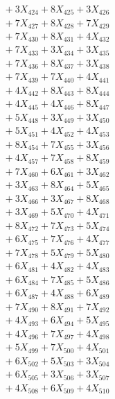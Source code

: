 \documentclass[a4paper,10pt]{article}
\begin{document}
{\begin{align}
&\;  + 3 X_{424} + 8 X_{425} + 3 X_{426} \\[0.3ex]
&\;  + 7 X_{427} + 8 X_{428} + 7 X_{429} \\[0.5ex]\allowbreak
&\;  + 7 X_{430} + 8 X_{431} + 4 X_{432} \\[0.3ex]
&\;  + 7 X_{433} + 3 X_{434} + 3 X_{435} \\[0.3ex]
&\;  + 7 X_{436} + 8 X_{437} + 3 X_{438} \\[0.3ex]
&\;  + 7 X_{439} + 7 X_{440} + 4 X_{441} \\[0.3ex]
&\;  + 4 X_{442} + 8 X_{443} + 8 X_{444} \\[0.3ex]
&\;  + 4 X_{445} + 4 X_{446} + 8 X_{447} \\[0.3ex]
&\;  + 5 X_{448} + 3 X_{449} + 3 X_{450} \\[0.3ex]
&\;  + 5 X_{451} + 4 X_{452} + 4 X_{453} \\[0.3ex]
&\;  + 8 X_{454} + 7 X_{455} + 3 X_{456} \\[0.3ex]
&\;  + 4 X_{457} + 7 X_{458} + 8 X_{459} \\[0.5ex]\allowbreak
&\;  + 7 X_{460} + 6 X_{461} + 3 X_{462} \\[0.3ex]
&\;  + 3 X_{463} + 8 X_{464} + 5 X_{465} \\[0.3ex]
&\;  + 3 X_{466} + 3 X_{467} + 8 X_{468} \\[0.3ex]
&\;  + 3 X_{469} + 5 X_{470} + 4 X_{471} \\[0.3ex]
&\;  + 8 X_{472} + 7 X_{473} + 5 X_{474} \\[0.3ex]
&\;  + 6 X_{475} + 7 X_{476} + 4 X_{477} \\[0.3ex]
&\;  + 7 X_{478} + 5 X_{479} + 5 X_{480} \\[0.3ex]
&\;  + 6 X_{481} + 4 X_{482} + 4 X_{483} \\[0.3ex]
&\;  + 6 X_{484} + 7 X_{485} + 5 X_{486} \\[0.3ex]
&\;  + 6 X_{487} + 4 X_{488} + 6 X_{489} \\[0.5ex]\allowbreak
&\;  + 7 X_{490} + 8 X_{491} + 7 X_{492} \\[0.3ex]
&\;  + 4 X_{493} + 6 X_{494} + 5 X_{495} \\[0.3ex]
&\;  + 4 X_{496} + 7 X_{497} + 4 X_{498} \\[0.3ex]
&\;  + 5 X_{499} + 7 X_{500} + 4 X_{501} \\[0.3ex]
&\;  + 6 X_{502} + 5 X_{503} + 3 X_{504} \\[0.3ex]
&\;  + 6 X_{505} + 3 X_{506} + 3 X_{507} \\[0.3ex]
&\;  + 4 X_{508} + 6 X_{509} + 4 X_{510} \\[0.3ex]

\end{align}}
\end{document}
